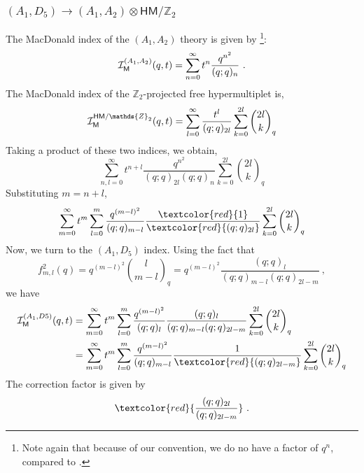 \documentclass[a4paper,10pt]{article}
\newcommand{\mr}[1]{\mathsf{#1}}
\def\CI {{\cal I}}
\def\CI {{{\cal I}}}
\begin{document}
\subsubsection{$(A_1,D_5)\to(A_1,A_2)\otimes\mr{HM}/\mathds{Z}_2$}
The MacDonald index of the $(A_1,A_2)$ theory is given by \cite{Bhargava:2023hsc}\footnote{Note again that because of our convention, we do no have a factor of $q^n$, compared to \cite{Bhargava:2023hsc}.}:
\begin{equation}
    \CI_{\mr{M}}^{(A_1,A_2)}(q,t)=\sum_{n=0}^{\infty}t^n\frac{q^{n^2}}{(q;q)_n}~.
\end{equation}
The MacDonald index of the $\mathds{Z}_2$-projected free hypermultiplet is,
\begin{equation}
    \CI_{\mr{M}}^{\mr{HM}/\mathds{Z}_2}(q,t)=\sum_{l=0}^{\infty}\frac{t^l}{(q;q)_{2l}}\sum_{k=0}^{2l}{2l\choose k}_q
\end{equation}
Taking a product of these two indices, we obtain,
\begin{equation}
    \sum_{n,l=0}^{\infty}t^{n+l}\frac{q^{n^2}}{(q;q)_{2l}(q;q)_n}\sum_{k=0}^{2l}{2l\choose k}_q
\end{equation}
Substituting $m=n+l$,
\begin{equation}
    \sum_{m=0}^{\infty}t^m\sum_{l=0}^m\frac{q^{(m-l)^2}}{(q;q)_{m-l}}\frac{\textcolor{red}{1}}{\textcolor{red}{(q;q)_{2l}}}\sum_{k=0}^{2l}{2l\choose k}_q
\end{equation}
Now, we turn to the $(A_1,D_5)$ index. Using the fact that 
\begin{equation}
    f^2_{m,l}(q)=q^{(m-l)^2}{l\choose m-l}_q=q^{(m-l)^2}\frac{(q;q)_{l}}{(q;q)_{m-l}(q;q)_{2l-m}}~,
\end{equation}
we have 
\begin{equation}
\begin{split}
    \CI_{\mr{M}}^{(A_1,D5)}(q,t)&=\sum_{m=0}^{\infty}t^m\sum_{l=0}^{m}\frac{q^{(m-l)^2}}{(q;q)_l}\frac{(q;q)_{l}}{(q;q)_{m-l}(q;q)_{2l-m}}\sum_{k=0}^{2l}{2l\choose k}_q
    \\
    &=\sum_{m=0}^{\infty}t^m\sum_{l=0}^{m}\frac{q^{(m-l)^2}}{(q;q)_{m-l}}\frac{1}{\textcolor{red}{(q;q)_{2l-m}}}\sum_{k=0}^{2l}{2l\choose k}_q
\end{split}
\end{equation}
The correction factor is given by 
\begin{equation}
    \textcolor{red}{\frac{(q;q)_{2l}}{(q;q)_{2l-m}}}~.
\end{equation}
\end{document}
